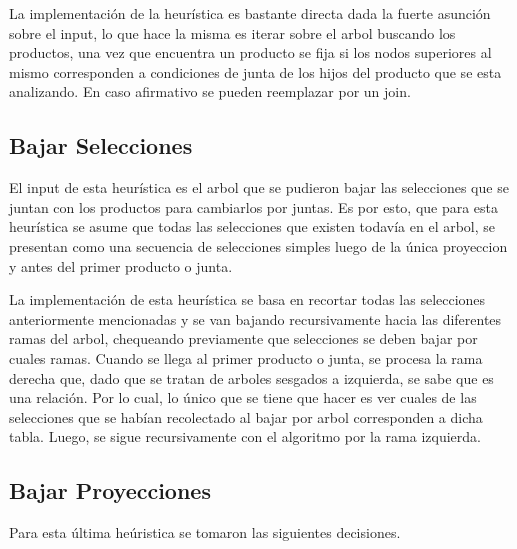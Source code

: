 \documentclass[a4paper,11pt]{article}
\begin{document}
La implementación de la heurística es bastante directa dada la fuerte asunción sobre el input, lo que hace la misma es iterar sobre el arbol buscando los productos, una vez que encuentra un producto se fija si los nodos superiores al mismo corresponden a condiciones de junta de los hijos del producto que se esta analizando. En caso afirmativo se pueden reemplazar por un join. 

\subsection{Bajar Selecciones}

El input de esta heur\'istica es el arbol que se pudieron bajar las selecciones que se juntan con los productos para cambiarlos por juntas. Es por esto, que para esta heur\'istica se asume que todas las selecciones que existen todav\'ia en el arbol, se presentan como una secuencia de selecciones simples luego de la \'unica proyeccion y antes del primer producto o junta. 

La implementaci\'on de esta heur\'istica se basa en recortar todas las selecciones anteriormente mencionadas y se van bajando recursivamente hacia las diferentes ramas del arbol, chequeando previamente que selecciones se deben bajar por cuales ramas. Cuando se llega al primer producto o junta, se procesa la rama derecha que, dado que se tratan de arboles sesgados a izquierda, se sabe que es una relaci\'on. Por lo cual, lo \'unico que se tiene que hacer es ver cuales de las selecciones que se hab\'ian recolectado al bajar por arbol corresponden a dicha tabla. Luego, se sigue recursivamente con el algoritmo por la rama izquierda.




\subsection{Bajar Proyecciones}

Para esta \'ultima he\'uristica se tomaron las siguientes decisiones.
\end{document}
